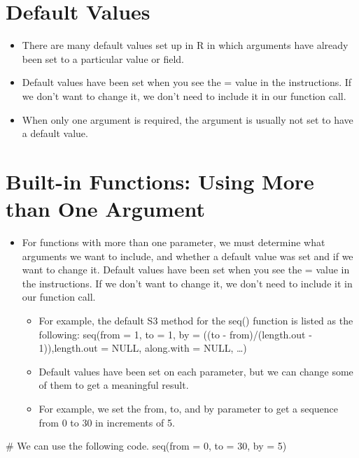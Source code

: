 \documentclass[
  letterpaper,
  DIV=11,
  numbers=noendperiod]{scrreprt}
\newenvironment{Shaded}{\begin{snugshade}}{\end{snugshade}}
\newcommand{\AttributeTok}[1]{\textcolor[rgb]{0.40,0.45,0.13}{#1}}
\newcommand{\CommentTok}[1]{\textcolor[rgb]{0.37,0.37,0.37}{#1}}
\newcommand{\DecValTok}[1]{\textcolor[rgb]{0.68,0.00,0.00}{#1}}
\newcommand{\FunctionTok}[1]{\textcolor[rgb]{0.28,0.35,0.67}{#1}}
\newcommand{\NormalTok}[1]{\textcolor[rgb]{0.00,0.23,0.31}{#1}}
\providecommand{\tightlist}{%
  \setlength{\itemsep}{0pt}\setlength{\parskip}{0pt}}\usepackage{longtable,booktabs,array}
\begin{document}
\section{Default Values}\label{default-values}

\begin{itemize}
\tightlist
\item
  There are many default values set up in R in which arguments have
  already been set to a particular value or field.
\item
  Default values have been set when you see the = value in the
  instructions. If we don't want to change it, we don't need to include
  it in our function call.
\item
  When only one argument is required, the argument is usually not set to
  have a default value.
\end{itemize}

\section{Built-in Functions: Using More than One
Argument}\label{built-in-functions-using-more-than-one-argument}

\begin{itemize}
\tightlist
\item
  For functions with more than one parameter, we must determine what
  arguments we want to include, and whether a default value was set and
  if we want to change it. Default values have been set when you see the
  = value in the instructions. If we don't want to change it, we don't
  need to include it in our function call.

  \begin{itemize}
  \tightlist
  \item
    For example, the default S3 method for the seq() function is listed
    as the following: seq(from = 1, to = 1, by = ((to -
    from)/(length.out - 1)),length.out = NULL, along.with = NULL,
    \ldots)
  \item
    Default values have been set on each parameter, but we can change
    some of them to get a meaningful result.
  \item
    For example, we set the from, to, and by parameter to get a sequence
    from 0 to 30 in increments of 5.
  \end{itemize}
\end{itemize}

\begin{Shaded}
\begin{Highlighting}[]
\CommentTok{\# We can use the following code.}
\FunctionTok{seq}\NormalTok{(}\AttributeTok{from =} \DecValTok{0}\NormalTok{, }\AttributeTok{to =} \DecValTok{30}\NormalTok{, }\AttributeTok{by =} \DecValTok{5}\NormalTok{)}
\end{Highlighting}
\end{Shaded}
\end{document}
